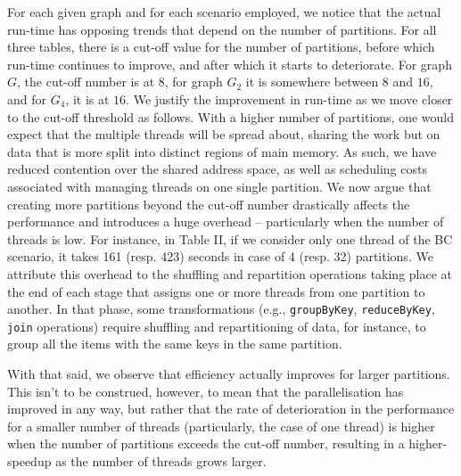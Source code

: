 For each given graph and for each scenario employed, we notice that the actual run-time has opposing trends that depend on the number of partitions. For all three tables, there is a cut-off value for the number of partitions, before which run-time continues to improve, and after which it starts to deteriorate. For graph $G$, the cut-off number is at $8$, for graph $G_2$ it is somewhere between $8$ and $16$, and for $G_4$, it is at $16$. We justify the improvement in run-time as we move closer to the cut-off threshold as follows. With a higher number of partitions, one would expect that the multiple threads will be spread about, sharing the work but on data that is more split into distinct regions of main memory. As such, we have reduced contention over the shared address space, as well as scheduling costs associated with managing threads on one single partition. We now argue that creating more partitions beyond the cut-off number drastically affects the performance and introduces a huge overhead -- particularly when the number of threads is low. For instance, in Table II, if we consider only one thread of the BC scenario, it takes 161 (resp. 423) seconds in case of 4 (resp. 32) partitions. We attribute this overhead to the shuffling and repartition operations taking place at the end of each stage that assigns one or more threads from one partition to another. In that phase, some transformations (e.g., \texttt{groupByKey}, \texttt{reduceByKey}, \texttt{join} operations) require shuffling and repartitioning of data, for instance, to group all the items with the same keys in the same partition. 

With that said, we observe that efficiency actually improves for larger partitions. This isn't to be construed, however, to mean that the parallelisation has improved in any way, but rather that the rate of deterioration in the performance for a smaller number of threads (particularly, the case of one thread) is higher when the number of partitions exceeds the cut-off number, resulting in a higher-speedup as the number of threads grows larger. 






